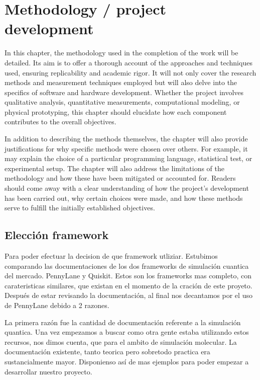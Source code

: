 \else
  \chapter{Methodology / project development}

  In this chapter, the methodology used in the completion of the work will be detailed. Its aim is to offer a thorough account of the approaches and techniques used, ensuring replicability and academic rigor. It will not only cover the research methods and measurement techniques employed but will also delve into the specifics of software and hardware development. Whether the project involves qualitative analysis, quantitative measurements, computational modeling, or physical prototyping, this chapter should elucidate how each component contributes to the overall objectives.
  
  In addition to describing the methods themselves, the chapter will also provide justifications for why specific methods were chosen over others. For example, it may explain the choice of a particular programming language, statistical test, or experimental setup. The chapter will also address the limitations of the methodology and how these have been mitigated or accounted for. Readers should come away with a clear understanding of how the project's development has been carried out, why certain choices were made, and how these methods serve to fulfill the initially established objectives.

\fi
\section{Elección framework}
Para poder efectuar la decision de que framework utliziar. Estubimos comparando las documentaciones de los dos frameworks de simulación cuantica del mercado. PennyLane y Quiskit. Estos son los frameworks mas completo, con carateristicas similares, que existan en el momento de la cración de este proyeto. Después de estar revisando la documentación, al final nos decantamos por el uso de PennyLane debido a 2 razones.

La primera razón fue la cantidad de documentación referente a la simulación quantica. Una vez empezamos a buscar como otra gente estaba utilizando estos recursos, nos dimos cuenta, que para el ambito de simulación molecular. La documentación existente, tanto teorica pero sobretodo practica era sustancialmente mayor. Disponienso así de mas ejemplos para poder empezar a desarrollar nuestro proyecto.

